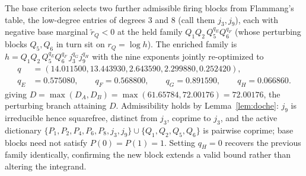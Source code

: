\documentclass[11pt,reqno]{amsart}
\theoremstyle{plain}
\theoremstyle{definition}
\theoremstyle{remark}
\newcommand{\rQ}{r_Q}
\newcommand{\dA}{D_A}
\newcommand{\dB}{D_B}
\begin{document}
The base criterion selects two further admissible firing blocks from Flammang's
\citep{F18} table, the low-degree entries of degrees $3$ and $8$ (call them $j_3,j_9$),
each with negative base marginal $\widetilde r_Q<0$ at the held family
$Q_1Q_2\,Q_5^{q_E}Q_6^{q_F}$ (whose perturbing blocks $Q_5,Q_6$ in turn sit on
$\rQ=\log h$). The enriched family is
$h=Q_1Q_2\,Q_5^{q_E}Q_6^{q_F}\,j_3^{q_G}j_9^{q_H}$ with the nine exponents jointly
re-optimized to
\begin{align*}
  q&=(14.011500,13.443930,2.643590,2.299880,0.252420),\\
  q_E&=0.575080,\qquad q_F=0.568800,\qquad
  q_G=0.891590,\qquad q_H=0.066860.
\end{align*}
giving $D=\max(\dA,\dB)=\max(61.65784,72.00176)=72.00176$, the perturbing branch
attaining $D$. Admissibility holds by Lemma~\ref{lem:doche}: $j_9$ is irreducible
hence squarefree, distinct from $j_3$, coprime to $j_3$, and the active dictionary
$\{P_1,P_2,P_4,P_6,P_8,j_3,j_9\}\cup\{Q_1,Q_2,Q_5,Q_6\}$ is pairwise coprime; base
blocks need not satisfy $P(0)=P(1)=1$. Setting $q_H=0$ recovers the previous family
identically, confirming the new block extends a valid bound rather than altering the
integrand.
\end{document}
